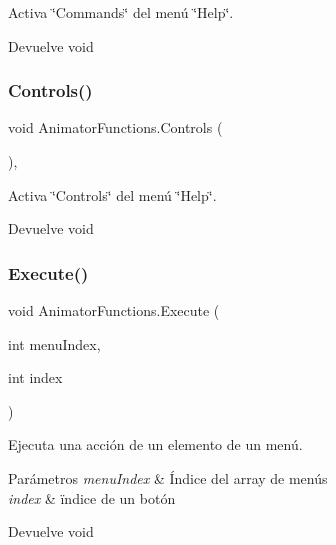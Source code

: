 Activa \char`\"{}\+Commands\char`\"{} del menú \char`\"{}\+Help\char`\"{}. \begin{DoxyReturn}{Devuelve}
void 
\end{DoxyReturn}
\mbox{\label{class_animator_functions_ab5fb7988a9df7571a4a74907a3b29ea5}} 
\subsubsection{\texorpdfstring{Controls()}{Controls()}}
{\footnotesize\ttfamily void Animator\+Functions.\+Controls (\begin{DoxyParamCaption}{ }\end{DoxyParamCaption})\hspace{0.3cm}{\ttfamily [inline]}, {\ttfamily [private]}}

Activa \char`\"{}\+Controls\char`\"{} del menú \char`\"{}\+Help\char`\"{}. \begin{DoxyReturn}{Devuelve}
void 
\end{DoxyReturn}
\mbox{\label{class_animator_functions_a50aa001c6ad05867751979b8e7f0abf8}} 
\subsubsection{\texorpdfstring{Execute()}{Execute()}}
{\footnotesize\ttfamily void Animator\+Functions.\+Execute (\begin{DoxyParamCaption}\item[{int}]{menu\+Index,  }\item[{int}]{index }\end{DoxyParamCaption})\hspace{0.3cm}{\ttfamily [inline]}}

Ejecuta una acción de un elemento de un menú. 
\begin{DoxyParams}{Parámetros}
{\em menu\+Index} & Índice del array de menús \\
\hline
{\em index} & ïndice de un botón \\
\hline
\end{DoxyParams}
\begin{DoxyReturn}{Devuelve}
void 
\end{DoxyReturn}
\mbox{\label{class_animator_functions_abbc94844d64966a7d1ad2d3e7cdde3c8}} 
